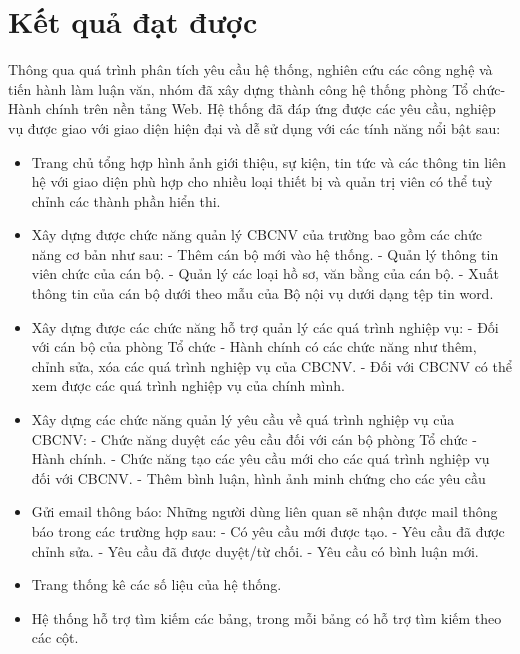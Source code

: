\section{Kết quả đạt được}
Thông qua quá trình phân tích yêu cầu hệ thống, nghiên cứu các công nghệ và tiến hành làm luận văn, nhóm đã xây dựng thành công hệ thống phòng Tổ chức-Hành chính trên nền tảng Web. Hệ thống đã đáp ứng được các yêu cầu, nghiệp vụ được giao với giao diện hiện đại và dễ sử dụng với các tính năng nổi bật sau:
\begin{itemize}
    \item Trang chủ tổng hợp hình ảnh giới thiệu, sự kiện, tin tức và các thông tin liên hệ với giao diện phù hợp cho nhiều loại thiết bị và quản trị viên có thể tuỳ chỉnh các thành phần hiển thi.
    \item Xây dựng được chức năng quản lý CBCNV của trường bao gồm các chức năng cơ bản như sau:
        \subitem - Thêm cán bộ mới vào hệ thống.
        \subitem - Quản lý thông tin viên chức của cán bộ.
        \subitem - Quản lý các loại hồ sơ, văn bằng của cán bộ.
        \subitem - Xuất thông tin của cán bộ dưới theo mẫu của Bộ nội vụ dưới dạng tệp tin word.
    \item Xây dựng được các chức năng hỗ trợ quản lý các quá trình nghiệp vụ:
        \subitem - Đối với cán bộ của phòng Tổ chức - Hành chính có các chức năng như thêm, chỉnh sửa, xóa các quá trình nghiệp vụ của CBCNV.
        \subitem - Đối với CBCNV có thể xem được các quá trình nghiệp vụ của chính mình.
    \item Xây dựng các chức năng quản lý yêu cầu về quá trình nghiệp vụ của CBCNV:
        \subitem - Chức năng duyệt các yêu cầu đối với cán bộ phòng Tổ chức - Hành chính.
        \subitem - Chức năng tạo các yêu cầu mới cho các quá trình nghiệp vụ đối với CBCNV.
        \subitem - Thêm bình luận, hình ảnh minh chứng cho các yêu cầu
    \item Gửi email thông báo: Những người dùng liên quan sẽ nhận được mail thông báo trong các trường hợp sau:
        \subitem - Có yêu cầu mới được tạo.
        \subitem - Yêu cầu đã được chỉnh sửa.
        \subitem - Yêu cầu đã được duyệt/từ chối.
        \subitem - Yêu cầu có bình luận mới.
    \item Trang thống kê các số liệu của hệ thống.
    \item Hệ thống hỗ trợ tìm kiếm các bảng, trong mỗi bảng có hỗ trợ tìm kiếm theo các cột.
\end{itemize}
